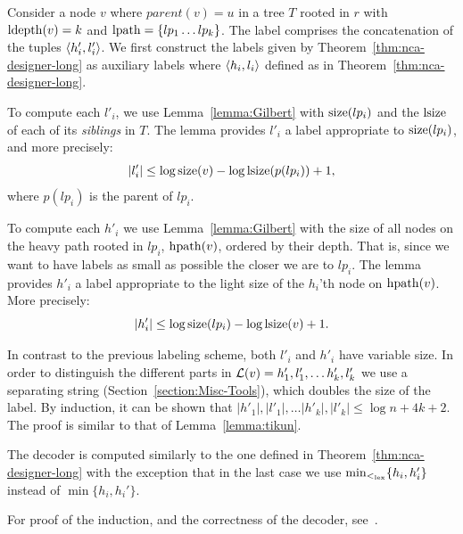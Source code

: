 		\begin{notproof}[Sketch]
		Consider a node $v$ where $parent(v)= u$ in a tree $T$ rooted in $r$ with $\operatorname{ldepth}(v) =k$ and  $\operatorname{lpath}= \{ lp_1 \dots lp_k \}$.
		The label  comprises the concatenation of the tuples  $\left \langle h'_i,l'_i \right \rangle $.
		We first construct the labels given by  Theorem~\ref{thm:nca-designer-long} as auxiliary labels where   $\left \langle h_i,l_i \right \rangle $  defined as in Theorem~\ref{thm:nca-designer-long}.
		
		To compute each $l'_i$, we use Lemma~\ref{lemma:Gilbert} with   $\operatorname{size}(lp_i)$ and the $\operatorname{lsize}$ of each of its  \emph{siblings}  in $T$.
		The lemma provides $l'_i$ a  label appropriate to $\operatorname{size}(lp_i)$, and more precisely:    
		$$\vert l'_i \vert  \leq  \log \operatorname{size}(v) -  \log \operatorname{lsize}(p(lp_i)) +1,$$
		where $p(lp_i)$ is the parent of $lp_i$.
		
		To compute each $h'_i$ we use  Lemma~\ref{lemma:Gilbert} with  the size of all nodes on the heavy path rooted in $lp_i$, $\operatorname{hpath}(v)$, ordered by their depth.
		That is, since we want to have labels as small as possible the closer we are to $lp_i$.
		The lemma provides $h'_i$ a  label appropriate to the light size of the $h_i$'th node on  $\operatorname{hpath}(v)$. More precisely:    
		$$\vert h'_i \vert \leq \log\operatorname{size}(lp_{i}) - \log\operatorname{lsize}(v) +1.$$
		
		In contrast to the previous labeling scheme, both $l'_i$ and $h'_i$ have variable size. In order to distinguish the different parts in $ \mathcal{L}(v) = h'_1,l'_1, \dots h'_k,l'_k$ we use a separating string (Section~\ref{section:Misc-Tools}), which doubles the size of the label.
		By induction,  it can be shown that $\vert h'_1 \vert, \vert l'_1 \vert, \dots  \vert h'_k \vert ,\vert l'_k \vert  \leq \log n +4k +2$. The proof is similar to that of Lemma~\ref{lemma:tikun}.
		
		The decoder is computed similarly to the one defined in Theorem~\ref{thm:nca-designer-long} with the exception that in the last case we use  $\min_{\lex}\{h_i,h_i'\}$ instead of $\min{\{h_i,h_i'\}}$.
		
		For proof of the induction, and the correctness  of the decoder, see~\cite{Esben13}.
		\end{notproof}


